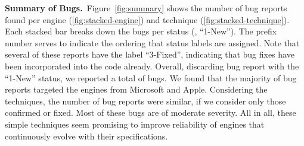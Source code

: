 \documentclass[10pt,conference,anonymous]{IEEEtran}
\begin{document}

\vspace{1ex}
\noindent\textbf{Summary of Bugs.}~Figure~\ref{fig:summary} shows the
number of bug reports found per engine (\ref{fig:stacked-engine}) and
technique (\ref{fig:stacked-technique}). Each stacked bar breaks down
the bugs per status (\eg{}, ``1-New''). The prefix number serves to
indicate the ordering that status labels are assigned. Note that
several of these reports have the label ``3-Fixed'', indicating that
bug fixes have been incorporated into the code already. Overall, discarding bug report with the
``1-New'' status, we reported a total of \noBugsTotalConfirmed{}
bugs. We found that the majority of bug reports targeted the engines
from Microsoft and Apple. Considering the techniques, the number of
bug reports were similar, if we consider only those confirmed or
fixed. Most of these bugs are of moderate severity. All in all, these
simple techniques seem promising to improve reliability of engines
that continuously evolve with their specifications.

\end{document}
